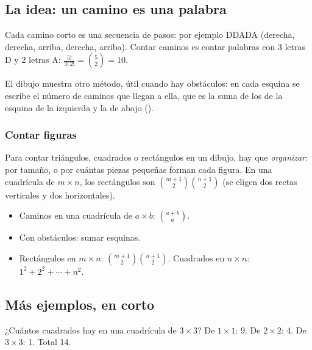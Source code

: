 \bitacora


\subsection{La idea: un camino es una palabra}
Cada camino corto es una secuencia de pasos: por ejemplo DDADA (derecha, derecha, arriba, derecha, arriba). Contar
caminos es contar palabras con 3 letras D y 2 letras A: $\tfrac{5!}{3!\,2!} = \binom52 = 10$.


El dibujo muestra otro método, útil cuando hay obstáculos: en cada esquina se escribe el número de caminos que llegan
a ella, que es la suma de los de la esquina de la izquierda y la de abajo ().

\subsubsection{Contar figuras}
Para contar triángulos, cuadrados o rectángulos en un dibujo, hay que \emph{organizar}: por tamaño, o por cuántas piezas
pequeñas forman cada figura. En una cuadrícula de $m \times n$, los rectángulos son $\binom{m+1}{2}\binom{n+1}{2}$ (se
eligen dos rectas verticales y dos horizontales).

\begin{regla}
\begin{itemize}
  \item Caminos en una cuadrícula de $a \times b$: $\binom{a + b}{a}$.
  \item Con obstáculos: sumar esquinas.
  \item Rectángulos en $m \times n$: $\binom{m + 1}{2}\binom{n + 1}{2}$. Cuadrados en $n \times n$: $1^2 + 2^2 + \cdots + n^2$.
\end{itemize}
\end{regla}

\subsection{Más ejemplos, en corto}
\begin{ejemplo}
¿Cuántos cuadrados hay en una cuadrícula de $3 \times 3$?
\solucion De $1 \times 1$: 9. De $2 \times 2$: 4. De $3 \times 3$: 1. Total 14.
\end{ejemplo}

